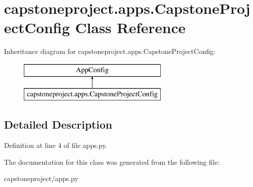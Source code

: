 \hypertarget{classcapstoneproject_1_1apps_1_1_capstone_project_config}{}\section{capstoneproject.\+apps.\+Capstone\+Project\+Config Class Reference}
\label{classcapstoneproject_1_1apps_1_1_capstone_project_config}
Inheritance diagram for capstoneproject.\+apps.\+Capstone\+Project\+Config\+:\begin{figure}[H]
\begin{center}
\leavevmode
\includegraphics[height=2.000000cm]{classcapstoneproject_1_1apps_1_1_capstone_project_config}
\end{center}
\end{figure}


\subsection{Detailed Description}


Definition at line 4 of file apps.\+py.



The documentation for this class was generated from the following file\+:\begin{DoxyCompactItemize}
\item 
capstoneproject/apps.\+py\end{DoxyCompactItemize}
